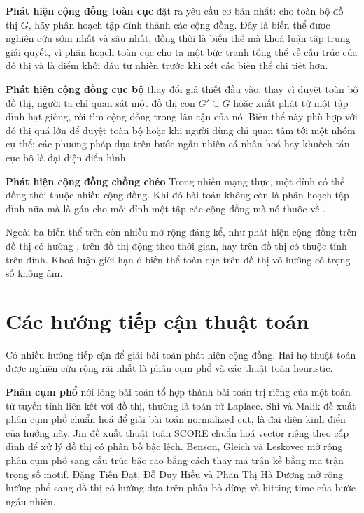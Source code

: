 \textbf{Phát hiện cộng đồng toàn cục} đặt ra yêu cầu cơ bản nhất: cho toàn bộ đồ thị $G$, hãy phân hoạch tập đỉnh thành các cộng đồng. Đây là biến thể được nghiên cứu sớm nhất và sâu nhất, đồng thời là biến thể mà khoá luận tập trung giải quyết, vì phân hoạch toàn cục cho ta một bức tranh tổng thể về cấu trúc của đồ thị và là điểm khởi đầu tự nhiên trước khi xét các biến thể chi tiết hơn.

\textbf{Phát hiện cộng đồng cục bộ} thay đổi giả thiết đầu vào: thay vì duyệt toàn bộ đồ thị, người ta chỉ quan sát một đồ thị con $G' \subseteq G$ hoặc xuất phát từ một tập đỉnh hạt giống, rồi tìm cộng đồng trong lân cận của nó. Biến thể này phù hợp với đồ thị quá lớn để duyệt toàn bộ hoặc khi người dùng chỉ quan tâm tới một nhóm cụ thể; các phương pháp dựa trên bước ngẫu nhiên cá nhân hoá hay khuếch tán cục bộ là đại diện điển hình.

\textbf{Phát hiện cộng đồng chồng chéo} Trong nhiều mạng thực, một đỉnh có thể đồng thời thuộc nhiều cộng đồng. Khi đó bài toán không còn là phân hoạch tập đỉnh nữa mà là gán cho mỗi đỉnh một tập các cộng đồng mà nó thuộc về \cite{do2025overlap}.

Ngoài ba biến thể trên còn nhiều mở rộng đáng kể, như phát hiện cộng đồng trên đồ thị có hướng \cite{dang2023directed}, trên đồ thị động theo thời gian, hay trên đồ thị có thuộc tính trên đỉnh. Khoá luận giới hạn ở biến thể toàn cục trên đồ thị vô hướng có trọng số không âm.

\section{Các hướng tiếp cận thuật toán}
\label{sec:huong-tiep-can}

Có nhiều hướng tiếp cận để giải bài toán phát hiện cộng đồng. Hai họ thuật toán được nghiên cứu rộng rãi nhất là phân cụm phổ và các thuật toán heuristic.

\textbf{Phân cụm phổ} nới lỏng bài toán tổ hợp thành bài toán trị riêng của một toán tử tuyến tính liên kết với đồ thị, thường là toán tử Laplace. Shi và Malik \cite{shi2000} đề xuất phân cụm phổ chuẩn hoá để giải bài toán normalized cut, là đại diện kinh điển của hướng này. Jin \cite{jin2015} đề xuất thuật toán SCORE chuẩn hoá vector riêng theo cấp đỉnh để xử lý đồ thị có phân bố bậc lệch. Benson, Gleich và Leskovec \cite{benson2016} mở rộng phân cụm phổ sang cấu trúc bậc cao bằng cách thay ma trận kề bằng ma trận trọng số motif. Đặng Tiến Đạt, Đỗ Duy Hiếu và Phan Thị Hà Dương \cite{dang2023directed} mở rộng hướng phổ sang đồ thị có hướng dựa trên phân bố dừng và hitting time của bước ngẫu nhiên.

